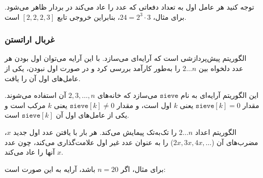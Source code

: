 توجه کنید هر عامل اول به تعداد دفعاتی که عدد را عاد می‌کند در بردار ظاهر می‌شود.
برای مثال، $24=2^3 \cdot 3$،
بنابراین خروجی تابع $[2,2,2,3]$ است.

\subsubsection{غربال اراتستن}


الگوریتم پیش‌پردازشی است که آرایه‌ای می‌سازد. با این آرایه می‌توان اول بودن هر عدد دلخواه بین $2 \ldots n$ را به‌طور کارآمد بررسی کرد و در صورت اول نبودن، یکی از عامل‌های اول آن را یافت.

این الگوریتم آرایه‌ای به نام $\texttt{sieve}$ می‌سازد که خانه‌های $2,3,\ldots,n$ آن استفاده می‌شوند.
مقدار $\texttt{sieve}[k]=0$ یعنی $k$ اول است،
و مقدار $\texttt{sieve}[k] \neq 0$ یعنی $k$ مرکب است و یکی از عامل‌های اول آن $\texttt{sieve}[k]$ است.

الگوریتم اعداد $2 \ldots n$ را تک‌به‌تک پیمایش می‌کند.
هر بار با یافتن عدد اول جدید $x$، مضرب‌های آن ($2x,3x,4x,\ldots$) را به عنوان عدد غیر اول علامت‌گذاری می‌کند، چون عدد $x$ آنها را عاد می‌کند.

برای مثال، اگر $n=20$ باشد، آرایه به این صورت است:

\begin{center}
\end{center}

